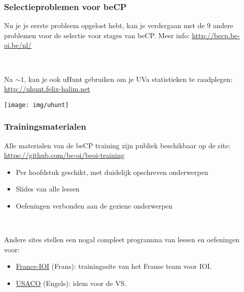 \documentclass[12pt]{beamer}
\newcommand{\urlb}[1]{{\color{linkblue}\url{#1}}}
\newcommand{\hrefb}[2]{{\color{linkblue}\href{#1}{#2}}}
\begin{document}
\begin{frame}
\frametitle{Selectieproblemen voor beCP}
    Nu je je eerste probleem opgelost hebt, kan je verdergaan met de 9 andere problemen voor de selectie voor stages van beCP. Meer info: \urlb{http://becp.be-oi.be/nl/}

~

    Na $\sim 1$, kan je ook uHunt gebruiken om je UVa statistieken te raadplegen: \urlb{http://uhunt.felix-halim.net}
\begin{center}
\texttt{[image: img/uhunt]}
\end{center}
\end{frame}

\begin{frame}
\frametitle{Trainingsmaterialen}
Alle materialen van de beCP training zijn publiek beschikbaar op de site: \urlb{https://github.com/be-oi/beoi-training}
\begin{itemize}
\item Per hoofdstuk geschikt, met duidelijk opschreven onderwerpen
\item Slides van alle lessen
\item Oefeningen verbonden aan de geziene onderwerpen
\end{itemize}

~

Andere sites stellen een nogal compleet programma van lessen en oefeningen voor:
\begin{itemize}
\item \hrefb{http://www.france-ioi.org}{France-IOI} (Frans): trainingssite van het Franse team voor IOI.
\item \hrefb{http://train.usaco.org/usacogate}{USACO} (Engels): idem voor de VS.
\end{itemize}
\end{frame}
\end{document}
